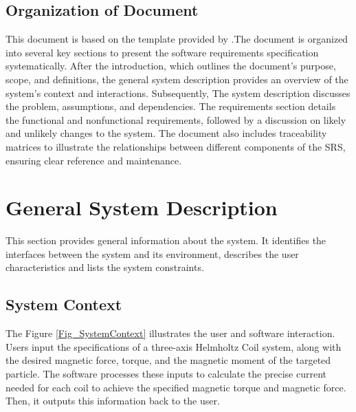 \documentclass[12pt]{article}
\begin{document}
\subsection{Organization of Document}
{
This document is based on the template provided by \citet{SmithandLai2005}.The document is organized into several key sections to present the software requirements specification systematically. After the introduction, which outlines the document's purpose, scope, and definitions, the general system description provides an overview of the system's context and interactions. Subsequently, The system description discusses the problem, assumptions, and dependencies. The requirements section details the functional and nonfunctional requirements, followed by a discussion on likely and unlikely changes to the system. The document also includes traceability matrices to illustrate the relationships between different components of the SRS, ensuring clear reference and maintenance.
}

\section{General System Description}

This section provides general information about the system.  It identifies the
interfaces between the system and its environment, describes the user
characteristics and lists the system constraints.
\subsection{System Context}

{
The Figure \ref{Fig_SystemContext} illustrates the user and software interaction. Users input the specifications of a three-axis Helmholtz Coil system, along with the desired magnetic force, torque, and the magnetic moment of the targeted particle. The software processes these inputs to calculate the precise current needed for each coil to achieve the specified magnetic torque and magnetic force. Then, it outputs this information back to the user.
}
\end{document}

